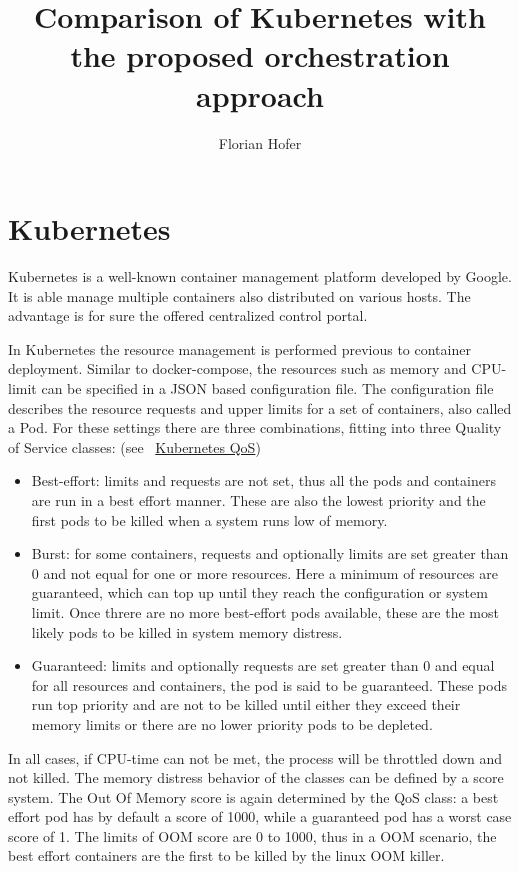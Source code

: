 \documentclass[]{scrartcl}
\title{Comparison of Kubernetes with the proposed orchestration approach}
\author{Florian Hofer}
\begin{document}
\maketitle

\section{Kubernetes}

Kubernetes is a well-known container management platform developed by Google. It is able manage multiple containers also distributed on various hosts. The advantage is for sure the offered centralized control portal. 

In Kubernetes the resource management is performed previous to container deployment. Similar to docker-compose, the resources such as memory and CPU-limit can be specified in a JSON based configuration file.
The configuration file describes the resource requests and upper limits for a set of containers, also called a Pod. 
For these settings there are three combinations, fitting into three Quality of Service classes: (see ~\href{https://github.com/kubernetes/community/blob/master/contributors/design-proposals/node/resource-qos.md}{Kubernetes QoS})
\begin{itemize}
	\item Best-effort: limits and requests are not set, thus all the pods and containers are run in a best effort manner.
	These are also the lowest priority and the first pods to be killed when a system runs low of memory.
	\item Burst: for some containers, requests and optionally limits are set greater than 0 and not equal for one or more resources.
	Here a minimum of resources are guaranteed, which can top up until they reach the configuration or system limit. Once threre are no more best-effort pods available, these are the most likely pods to be killed in system memory distress.
	\item Guaranteed: limits and optionally requests are set greater than 0 and equal for all resources and containers, the pod is said to be guaranteed. 
	These pods run top priority and are not to be killed until either they exceed their memory limits or there are no lower priority pods to be depleted. 
\end{itemize}
In all cases, if CPU-time can not be met, the process will be throttled down and not killed. 
The memory distress behavior of the classes can be defined by a score system. 
The Out Of Memory score is again determined by the QoS class: a best effort pod has by default a score of 1000, while a guaranteed pod has a worst case score of 1. The limits of OOM score are 0 to 1000, thus in a OOM scenario, the best effort containers are the first to be killed by the linux OOM killer.
\end{document}
